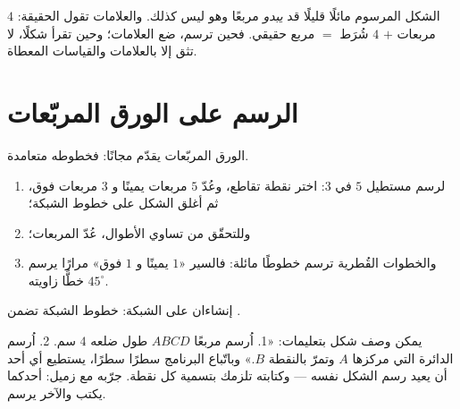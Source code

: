 \begin{example}\label{ex:g3:shapes:marks}
الشكل المرسوم مائلًا قليلًا قد \emph{يبدو} مربعًا وهو ليس كذلك.
والعلامات تقول الحقيقة: $4$ مربعات  $+$ $4$
شُرَط $=$ مربع حقيقي. فحين ترسم، ضع العلامات؛ وحين تقرأ شكلًا،
لا تثق إلا بالعلامات والقياسات المعطاة.
\end{example}

\section{الرسم على الورق المربّعات}

\begin{method}\label{met:g3:shapes:grid}
الورق المربّعات يقدّم  مجانًا: فخطوطه متعامدة.
\begin{enumerate}
  \item لرسم مستطيل $5$ في $3$: اختر نقطة تقاطع،
        وعُدّ $5$ مربعات يمينًا و $3$ مربعات فوق، ثم أغلق الشكل
        على خطوط الشبكة؛
  \item وللتحقّق من تساوي الأطوال، عُدّ المربعات؛
  \item والخطوات القُطرية ترسم خطوطًا مائلة: فالسير «$1$ يمينًا
        و $1$ فوق» مرارًا يرسم خطًّا زاويته $45^\circ$.
\end{enumerate}
\end{method}

\begin{omfigure}

{\small إنشاءان على الشبكة: خطوط الشبكة تضمن
.}
\end{omfigure}

\begin{example}\label{ex:g3:shapes:program}
يمكن وصف شكل بتعليمات:
«1. اُرسم مربعًا $ABCD$ طول ضلعه $4$ سم. 2. اُرسم الدائرة التي
مركزها $A$ وتمرّ بالنقطة $B$.» وباتّباع البرنامج سطرًا سطرًا،
يستطيع أي أحد أن يعيد رسم الشكل نفسه --- وكتابته تلزمك بتسمية
كل نقطة. جرّبه مع زميل: أحدكما يكتب والآخر
يرسم.
\end{example}

